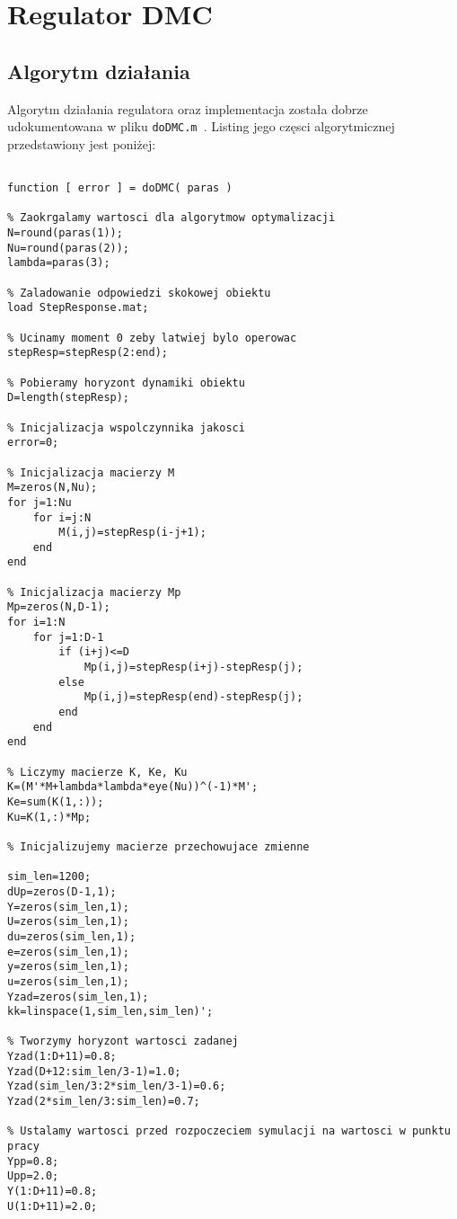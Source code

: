 \chapter{Regulator DMC}
\label{zad5}


\section{Algorytm działania}
Algorytm działania regulatora oraz implementacja została dobrze udokumentowana w pliku \verb+doDMC.m +. Listing jego częsci algorytmicznej przedstawiony jest poniżej:
\begin{lstlisting}[style=custommatlab,frame=single,label={zad4_sim_lst},caption={Implementacja regulatora DMC},captionpos=b]

function [ error ] = doDMC( paras )   

% Zaokrgalamy wartosci dla algorytmow optymalizacji
N=round(paras(1));
Nu=round(paras(2));
lambda=paras(3);

% Zaladowanie odpowiedzi skokowej obiektu
load StepResponse.mat;

% Ucinamy moment 0 zeby latwiej bylo operowac
stepResp=stepResp(2:end);

% Pobieramy horyzont dynamiki obiektu
D=length(stepResp);

% Inicjalizacja wspolczynnika jakosci
error=0;

% Inicjalizacja macierzy M
M=zeros(N,Nu);
for j=1:Nu
    for i=j:N
        M(i,j)=stepResp(i-j+1);
    end
end

% Inicjalizacja macierzy Mp
Mp=zeros(N,D-1);
for i=1:N
    for j=1:D-1
        if (i+j)<=D
            Mp(i,j)=stepResp(i+j)-stepResp(j);
        else
            Mp(i,j)=stepResp(end)-stepResp(j);
        end
    end
end

% Liczymy macierze K, Ke, Ku
K=(M'*M+lambda*lambda*eye(Nu))^(-1)*M';
Ke=sum(K(1,:));
Ku=K(1,:)*Mp;

% Inicjalizujemy macierze przechowujace zmienne

sim_len=1200;
dUp=zeros(D-1,1);
Y=zeros(sim_len,1);
U=zeros(sim_len,1);
du=zeros(sim_len,1);
e=zeros(sim_len,1);
y=zeros(sim_len,1);
u=zeros(sim_len,1);
Yzad=zeros(sim_len,1);
kk=linspace(1,sim_len,sim_len)';

% Tworzymy horyzont wartosci zadanej
Yzad(1:D+11)=0.8;
Yzad(D+12:sim_len/3-1)=1.0;
Yzad(sim_len/3:2*sim_len/3-1)=0.6;
Yzad(2*sim_len/3:sim_len)=0.7;

% Ustalamy wartosci przed rozpoczeciem symulacji na wartosci w punktu pracy
Ypp=0.8;
Upp=2.0;
Y(1:D+11)=0.8;
U(1:D+11)=2.0;


\end{lstlisting}
